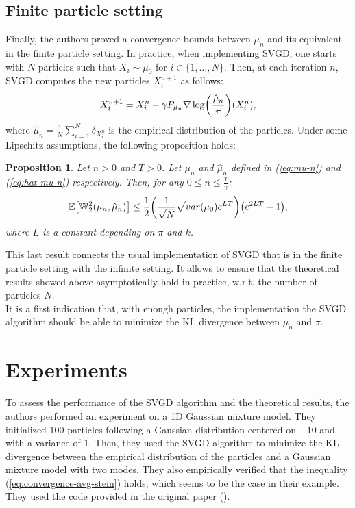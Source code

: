 \documentclass{article}
\newcommand{\E}{\mathbb{E}}
\newcommand{\KL}{\mathrm{KL}}
\newcommand{\W}{\mathbb{W}}
\DeclarePairedDelimiter{\pare}{(}{)}
\DeclarePairedDelimiter{\sq}{[}{]}
\newtheorem{proposition}{Proposition}
\begin{document}
\subsection{Finite particle setting}
Finally, the authors proved a convergence bounds between
$\mu_n$ and its equivalent in the finite particle setting.
In practice, when implementing SVGD, one starts with $N$ particles
such that $X_i \sim \mu_0$ for $i \in \{1, \ldots, N\}$.
Then, at each iteration $n$, SVGD computes the new particles $X_i^{n+1}$
as follows:
\begin{equation}
X_i^{n+1} = X_i^n - \gamma P_{\hat{\mu}_n} \nabla \log \pare*{ \frac{\hat{\mu}_n}{\pi} }(X_i^n),
\label{eq:hat-mu-n}
\end{equation}
where $\hat{\mu}_n = \frac{1}{N} \sum_{i=1}^N \delta_{X_i^n} $ is the empirical distribution
of the particles. Under some Lipschitz assumptions, the following proposition holds:
\begin{proposition}
  Let $n > 0$ and $T > 0$. Let $\mu_n$ and $\hat{\mu}_n$ defined in (\ref{eq:mu-n}) and
  (\ref{eq:hat-mu-n}) respectively. Then, for any $0 \leq n \leq \frac{T}{\gamma}$:
  \begin{equation}
    \E\sq*{ \W_2^2(\mu_n, \hat{\mu}_n) } \leq \frac{1}{2}
      \pare*{ \frac{1}{\sqrt{N}} \sqrt{var(\mu_0)} e^{LT} } \pare*{e^{2LT} - 1},
    \label{eq:W2-bounds}
  \end{equation}
  where $L$ is a constant depending on $\pi$ and $k$.
\end{proposition}
This last result connects the usual implementation of SVGD
that is in the finite particle setting with the infinite setting.
It allows to ensure that
the theoretical results showed above asymptotically hold in practice,
w.r.t. the number of particles $N$.\\
It is a first indication that, with enough particles, the implementation the SVGD algorithm
should be able to minimize the $\KL$ divergence between $\mu_n$ and $\pi$.


\section{Experiments}
To assess the performance of the SVGD algorithm and the theoretical results,
the authors performed an experiment on a 1D Gaussian mixture model.
They initialized $100$ particles following a Gaussian distribution
centered on $-10$ and with a variance of $1$.
Then, they used the SVGD algorithm to minimize the $\KL$ divergence
between the empirical distribution of the particles and
a Gaussian mixture model with two modes.
They also empirically verified that the inequality (\ref{eq:convergence-avg-stein})
holds, which seems to be the case in their example.
They used the code provided in the original paper (\cite{Original-SVGD}).\\
\end{document}
